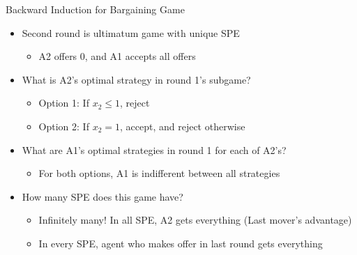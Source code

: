 \documentclass[11pt,aspectratio=169,handout]{beamer}
\begin{document}
  \begin{frame}{Backward Induction for Bargaining Game}
   \begin{itemize}[<+->]
   \setlength{\itemsep}{0.5em}
    \item Second round is ultimatum game with \alert{unique SPE}
    \begin{itemize}
     \item A2 offers $0$, and A1 accepts all offers 
    \end{itemize}
    \item What is A2's optimal strategy in round 1's subgame?
    \begin{itemize}
     \item \alert{Option 1}: If $x_2 \leq 1$, reject 
     \item \alert{Option 2}: If $x_2=1$, accept, and reject otherwise
    \end{itemize}
    \item What are A1's optimal strategies in round 1 for each of A2's?
    \begin{itemize}
     \item For both options, A1 is indifferent between all strategies
    \end{itemize}
    \item How many SPE does this game have?
    \begin{itemize}
     \item Infinitely many! In all SPE, A2 gets everything (\alert{Last mover's advantage})
     \item In every SPE, agent who makes offer in last round gets everything
    \end{itemize}
   \end{itemize}
  \end{frame}
\end{document}
